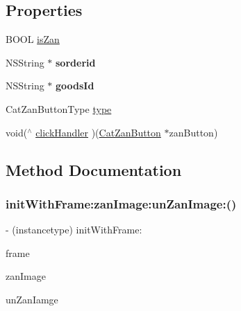 \subsection*{Properties}
\begin{DoxyCompactItemize}
\item 
B\+O\+OL \mbox{\hyperlink{interface_cat_zan_button_a13b594c955ad55c2fb8c8ea75a1ddd2c}{is\+Zan}}
\item 
\mbox{\label{interface_cat_zan_button_a290ff18390a35aa732eb866bfe180fc6}} 
N\+S\+String $\ast$ {\bfseries sorderid}
\item 
\mbox{\label{interface_cat_zan_button_a8567c88c5daea49c770a141da9950714}} 
N\+S\+String $\ast$ {\bfseries goods\+Id}
\item 
Cat\+Zan\+Button\+Type \mbox{\hyperlink{interface_cat_zan_button_a59b3c2768a9616577c768528bf0cbfb9}{type}}
\item 
void($^\wedge$ \mbox{\hyperlink{interface_cat_zan_button_a992f026429305310a08ca7f774fdb7ed}{click\+Handler}} )(\mbox{\hyperlink{interface_cat_zan_button}{Cat\+Zan\+Button}} $\ast$zan\+Button)
\end{DoxyCompactItemize}


\subsection{Method Documentation}
\mbox{\label{interface_cat_zan_button_ab9556ea56d76bb6f11eb896c9f7d3def}} 
\subsubsection{\texorpdfstring{init\+With\+Frame\+:zan\+Image\+:un\+Zan\+Image\+:()}{initWithFrame:zanImage:unZanImage:()}}
{\footnotesize\ttfamily -\/ (instancetype) init\+With\+Frame\+: \begin{DoxyParamCaption}\item[{(C\+G\+Rect)}]{frame }\item[{zanImage:(U\+I\+Image $\ast$)}]{zan\+Image }\item[{unZanImage:(U\+I\+Image $\ast$)}]{un\+Zan\+Iamge }\end{DoxyParamCaption}}

